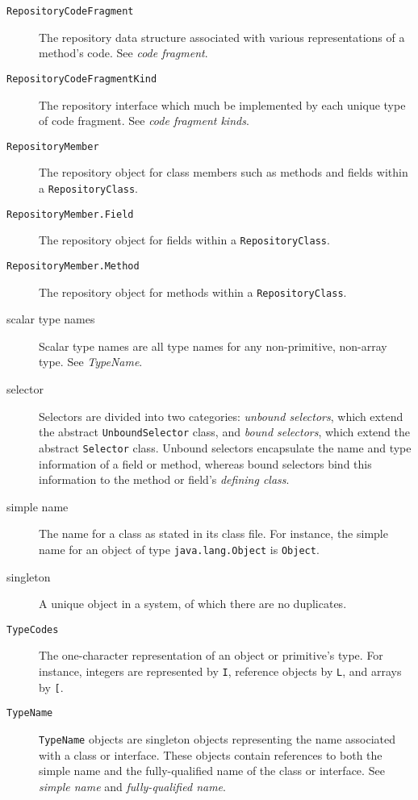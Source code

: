\documentclass{report}
\begin{document}
\begin{description}
	\item[\texttt{RepositoryCodeFragment}] The repository data structure
	associated with various representations of a method's code.
	See {\em code fragment}.

	\item[\texttt{RepositoryCodeFragmentKind}] The repository interface
	which much be implemented by each unique type of code fragment.
	See {\em code fragment kinds}.

	\item[\texttt{RepositoryMember}] The repository object for class 
	members	such as methods and fields within a 
	\texttt{Re\-pos\-i\-tory\-Class}.

	\item[\texttt{RepositoryMember.Field}] The repository object for fields
	within a \texttt{Re\-pos\-i\-tory\-Class}.

	\item[\texttt{RepositoryMember.Method}] The repository object for 
	methods	within a \texttt{Re\-pos\-i\-tory\-Class}.

	\item[scalar type names] Scalar type names are all type names for
	any non-primitive, non-array type. See {\em TypeName}.

	\item[selector] Selectors are divided into two categories:
	{\em unbound selectors}, which extend the abstract
	\texttt{Un\-bound\-Se\-lec\-tor} class, and 
	{\em bound selectors}, which extend the abstract \texttt{Se\-lec\-tor}
	class. Unbound selectors encapsulate the name and type information 
	of a field or method, whereas bound selectors bind this information to 
	the method or field's {\em defining class}.

	\item[simple name] The name for a class as stated in its class
	file. For instance, the simple name for an object of type
	\texttt{java.lang.Object} is \texttt{Object}.

	\item[singleton] A unique object in a system, of which there are
	no duplicates.

	\item[\texttt{TypeCodes}] The one-character representation
	of an object or primitive's type. For instance, integers are
	represented by \texttt{I}, reference objects by \texttt{L},
	and arrays by \texttt{[}.

	\item[\texttt{TypeName}] \texttt{TypeName} objects are singleton
	objects representing the name associated with a class or
	interface. These objects contain references to both the simple
	name and the fully-qualified name of the class or interface.
	See {\em simple name} and {\em fully-qualified name}.


\end{description}
\end{document}

